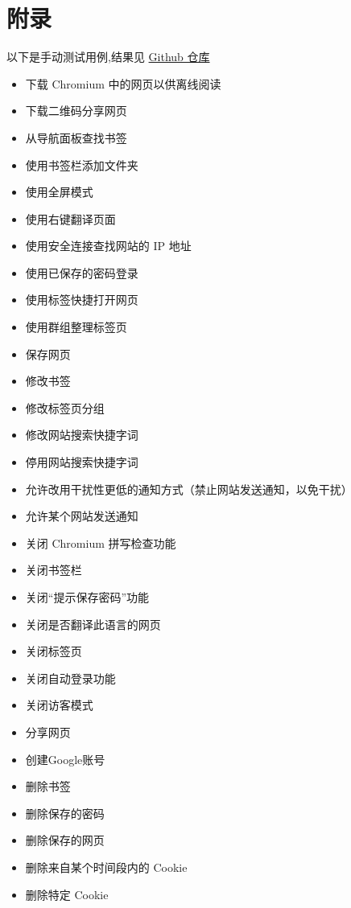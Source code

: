 \documentclass{article}
\begin{document}
\newpage
\section{附录}

\appendix

以下是手动测试用例,结果见 \href{https://github.com/QA-Team-lo/chromium_test}{Github 仓库}

\begin{itemize}
    \item 下载 Chromium 中的网页以供离线阅读
    \item 下载二维码分享网页
    \item 从导航面板查找书签
    \item 使用书签栏添加文件夹
    \item 使用全屏模式
    \item 使用右键翻译页面
    \item 使用安全连接查找网站的 IP 地址
    \item 使用已保存的密码登录
    \item 使用标签快捷打开网页
    \item 使用群组整理标签页
    \item 保存网页
    \item 修改书签
    \item 修改标签页分组
    \item 修改网站搜索快捷字词
    \item 停用网站搜索快捷字词
    \item 允许改用干扰性更低的通知方式（禁止网站发送通知，以免干扰）
    \item 允许某个网站发送通知
    \item 关闭 Chromium 拼写检查功能
    \item 关闭书签栏
    \item 关闭“提示保存密码”功能
    \item 关闭是否翻译此语言的网页
    \item 关闭标签页
    \item 关闭自动登录功能
    \item 关闭访客模式
    \item 分享网页
    \item 创建Google账号
    \item 删除书签
    \item 删除保存的密码
    \item 删除保存的网页
    \item 删除来自某个时间段内的 Cookie
    \item 删除特定 Cookie

\end{itemize}
\end{document}
